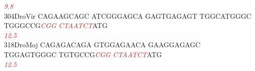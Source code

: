 \documentclass[11pt,twoside,reqno,a4paper]{article}
\begin{document}
{\hspace*{4\charwidth}\hspace*{7\charwidth}\hspace*{1\charwidth}\hspace*{1\charwidth}\hspace*{1\charwidth}\hspace*{1\charwidth}\hspace*{47\charwidth}\textit{\textcolor{Brown}{9.8}}\hspace*{1\charwidth}\hspace*{1\charwidth}\\
304\hspace*{1\charwidth}DroVir	CAGAAGCAGC	ATCGGGAGCA	GAGTGAGAGT	TGGCATGGGC	TGGGCCG\textit{\textcolor{Brown}{C}}\textit{\textcolor{Brown}{G}}\textit{\textcolor{Brown}{G}}	\textit{\textcolor{Brown}{C}}\textit{\textcolor{Brown}{T}}\textit{\textcolor{Brown}{A}}\textit{\textcolor{Brown}{A}}\textit{\textcolor{Brown}{T}}\textit{\textcolor{Brown}{C}}\textit{\textcolor{Brown}{T}}ATG	\\
\hspace*{4\charwidth}\hspace*{7\charwidth}\hspace*{1\charwidth}\hspace*{1\charwidth}\hspace*{1\charwidth}\hspace*{1\charwidth}\hspace*{47\charwidth}\textit{\textcolor{Brown}{12.5}}\hspace*{1\charwidth}\hspace*{1\charwidth}\\
318\hspace*{1\charwidth}DroMoj	CAGAGACAGA	GTGGAGAACA	GAAGGAGAGC	TGGAGTGGGC	TGTGCCG\textit{\textcolor{Brown}{C}}\textit{\textcolor{Brown}{G}}\textit{\textcolor{Brown}{G}}	\textit{\textcolor{Brown}{C}}\textit{\textcolor{Brown}{T}}\textit{\textcolor{Brown}{A}}\textit{\textcolor{Brown}{A}}\textit{\textcolor{Brown}{T}}\textit{\textcolor{Brown}{C}}\textit{\textcolor{Brown}{T}}ATG	\\
\hspace*{4\charwidth}\hspace*{7\charwidth}\hspace*{1\charwidth}\hspace*{1\charwidth}\hspace*{1\charwidth}\hspace*{1\charwidth}\hspace*{47\charwidth}\textit{\textcolor{Brown}{12.5}}\hspace*{1\charwidth}\hspace*{1\charwidth}\\
}
\end{document}
